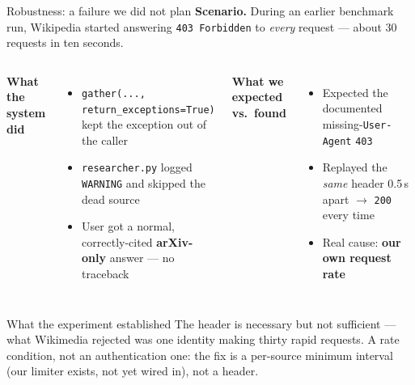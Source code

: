 \documentclass[aspectratio=169,11pt]{beamer}
\begin{document}
\begin{frame}{Robustness: a failure we did not plan}
  \textbf{Scenario.} During an earlier benchmark run, Wikipedia started answering
  \texttt{403 Forbidden} to \emph{every} request --- about 30 requests in ten seconds.

  \vspace{0.35em}
  \begin{columns}[T,onlytextwidth]
  \textbf{What the system did}
  \begin{itemize}\setlength\itemsep{0.2em}
    \item {\small \texttt{gather(..., return\_exceptions=True)} kept the exception out of the caller}
    \item {\small \texttt{researcher.py} logged \texttt{WARNING} and skipped the dead source}
    \item {\small User got a normal, correctly-cited \textbf{arXiv-only} answer --- no traceback}
  \end{itemize}

  \textbf{What we expected vs.\ found}
  \begin{itemize}\setlength\itemsep{0.2em}
    \item {\small Expected the documented missing-\texttt{User-Agent} \texttt{403}}
    \item {\small Replayed the \emph{same} header 0.5\,s apart $\to$ \texttt{200} every time}
    \item {\small Real cause: \textbf{our own request rate}}
  \end{itemize}
  \end{columns}

  \vspace{0.4em}
  \begin{block}{What the experiment established}
    \small The header is necessary but not sufficient --- what Wikimedia rejected was one identity
    making thirty rapid requests. A rate condition, not an authentication one: the fix is a per-source minimum interval (our limiter exists, not yet wired in), not a header.
  \end{block}

\end{frame}
\end{document}
